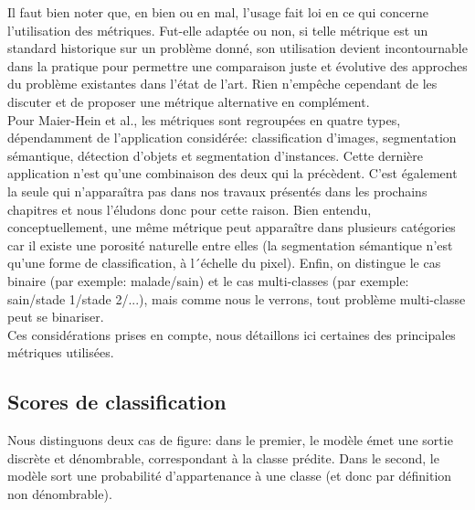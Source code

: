 Il faut bien noter que, en bien ou en mal, l'usage fait loi en ce qui concerne l'utilisation des métriques. Fut-elle adaptée ou non, si telle métrique est un standard historique sur un problème donné, son utilisation devient incontournable dans la pratique pour permettre une comparaison juste et évolutive des approches du problème existantes dans l'état de l'art. Rien n'empêche cependant de les discuter et de proposer une métrique alternative en complément.
\\
Pour Maier-Hein et al., les métriques sont regroupées en quatre types, dépendamment de l'application considérée: classification d'images, segmentation sémantique, détection d'objets et segmentation d'instances. Cette dernière application n'est qu'une combinaison des deux qui la précèdent. C'est également la seule qui n'apparaîtra pas dans nos travaux présentés dans les prochains chapitres et nous l'éludons donc pour cette raison. Bien entendu, conceptuellement, une même métrique peut apparaître dans plusieurs catégories car il existe une porosité naturelle entre elles (la segmentation sémantique n'est qu'une forme de classification, à l´échelle du pixel). Enfin, on distingue le cas binaire (par exemple: malade/sain) et le cas multi-classes (par exemple: sain/stade 1/stade 2/...), mais comme nous le verrons, tout problème multi-classe peut se binariser.
\\
Ces considérations prises en compte, nous détaillons ici certaines des principales métriques utilisées. 
\subsection{Scores de classification}
Nous distinguons deux cas de figure: dans le premier, le modèle émet une sortie discrète et dénombrable, correspondant à la classe prédite. Dans le second, le modèle sort une probabilité d'appartenance à une classe (et donc par définition non dénombrable).
